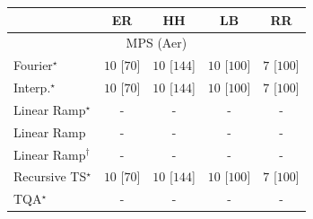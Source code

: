 \begin{tabular}{l|cccc|}
\toprule
            & ER & HH & LB & RR \\
\midrule
\multicolumn{5}{c}{\rule{0pt}{8pt}MPS (Aer)} \\
\midrule
Fourier$^\star$ & {\cellcolor[HTML]{00441B}} \color[HTML]{F1F1F1} $10$ [$70$] & {\cellcolor[HTML]{00441B}} \color[HTML]{F1F1F1} $10$ [$144$] & {\cellcolor[HTML]{00441B}} \color[HTML]{F1F1F1} $10$ [$100$] & {\cellcolor[HTML]{37A055}} \color[HTML]{F1F1F1} $7$ [$100$] \\
Interp.$^\star$ & {\cellcolor[HTML]{00441B}} \color[HTML]{F1F1F1} $10$ [$70$] & {\cellcolor[HTML]{00441B}} \color[HTML]{F1F1F1} $10$ [$144$] & {\cellcolor[HTML]{00441B}} \color[HTML]{F1F1F1} $10$ [$100$] & {\cellcolor[HTML]{37A055}} \color[HTML]{F1F1F1} $7$ [$100$] \\
Linear Ramp$^\star$ & {\cellcolor[HTML]{000000}} \color[HTML]{F1F1F1} {\cellcolor{white}} \color{black} - & {\cellcolor[HTML]{000000}} \color[HTML]{F1F1F1} {\cellcolor{white}} \color{black} - & {\cellcolor[HTML]{000000}} \color[HTML]{F1F1F1} {\cellcolor{white}} \color{black} - & {\cellcolor[HTML]{000000}} \color[HTML]{F1F1F1} {\cellcolor{white}} \color{black} - \\
Linear Ramp & {\cellcolor[HTML]{000000}} \color[HTML]{F1F1F1} {\cellcolor{white}} \color{black} - & {\cellcolor[HTML]{000000}} \color[HTML]{F1F1F1} {\cellcolor{white}} \color{black} - & {\cellcolor[HTML]{000000}} \color[HTML]{F1F1F1} {\cellcolor{white}} \color{black} - & {\cellcolor[HTML]{000000}} \color[HTML]{F1F1F1} {\cellcolor{white}} \color{black} - \\
Linear Ramp$^\dagger$ & {\cellcolor[HTML]{000000}} \color[HTML]{F1F1F1} {\cellcolor{white}} \color{black} - & {\cellcolor[HTML]{000000}} \color[HTML]{F1F1F1} {\cellcolor{white}} \color{black} - & {\cellcolor[HTML]{000000}} \color[HTML]{F1F1F1} {\cellcolor{white}} \color{black} - & {\cellcolor[HTML]{000000}} \color[HTML]{F1F1F1} {\cellcolor{white}} \color{black} - \\
Recursive TS$^\star$ & {\cellcolor[HTML]{00441B}} \color[HTML]{F1F1F1} $10$ [$70$] & {\cellcolor[HTML]{00441B}} \color[HTML]{F1F1F1} $10$ [$144$] & {\cellcolor[HTML]{00441B}} \color[HTML]{F1F1F1} $10$ [$100$] & {\cellcolor[HTML]{37A055}} \color[HTML]{F1F1F1} $7$ [$100$] \\
TQA$^\star$ & {\cellcolor[HTML]{000000}} \color[HTML]{F1F1F1} {\cellcolor{white}} \color{black} - & {\cellcolor[HTML]{000000}} \color[HTML]{F1F1F1} {\cellcolor{white}} \color{black} - & {\cellcolor[HTML]{000000}} \color[HTML]{F1F1F1} {\cellcolor{white}} \color{black} - & {\cellcolor[HTML]{000000}} \color[HTML]{F1F1F1} {\cellcolor{white}} \color{black} - \\

\end{tabular}
